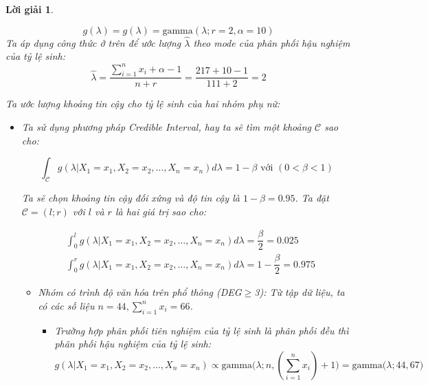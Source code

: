 \documentclass[14pt, a4paper]{article}
\theoremstyle{sltheorem}
\theoremstyle{soltheorem}
\newtheorem*{loigiai}{Lời giải}
\begin{document}
\begin{loigiai}
\begin{enumerate}
\begin{itemize}
\begin{itemize}
                \begin{equation*}
                    g(\lambda) = g(\lambda) = \text{gamma}(\lambda; r=2, \alpha=10)
                \end{equation*}
                Ta áp dụng công thức ở trên để ước lượng $\hat{\lambda}$ theo mode của phân phối hậu nghiệm của tỷ lệ sinh:
                \begin{equation*}
                    \hat{\lambda} = \dfrac{\sum_{i=1}^n x_i + \alpha - 1}{n + r} = \dfrac{217+10-1}{111 + 2}=2
                \end{equation*}
            \end{itemize}
        \end{itemize}

        Ta ước lượng khoảng tin cậy cho tỷ lệ sinh của hai nhóm phụ nữ:

        \begin{itemize}
            \item Ta sử dụng phương pháp Credible Interval, hay ta sẽ tìm một khoảng $\mathcal{C}$ sao cho:

        \begin{equation*}
            \int_{\mathcal{C}} g(\lambda \vert X_1 =x_1, X_2=x_2, \dots, X_n=x_n) d\lambda = 1 - \beta \text{ với } (0 < \beta < 1)
        \end{equation*}

        Ta sẽ chọn khoảng tin cậy đối xứng và độ tin cậy là $1-\beta=0.95$.
        Ta đặt $\mathcal{C}=(l;r)$ với $l$ và $r$ là hai giá trị sao cho:

        \begin{equation*}
            \begin{aligned}
                &\int_{0}^l g(\lambda \vert X_1 =x_1, X_2=x_2, \dots, X_n=x_n) d\lambda = \dfrac{\beta}{2}=0.025 \\
                &\int_{0}^r g(\lambda \vert X_1 =x_1, X_2=x_2, \dots, X_n=x_n) d\lambda = 1-\dfrac{\beta}{2}=0.975
            \end{aligned}
        \end{equation*}

        \begin{itemize}
            \item Nhóm có trình độ văn hóa trên phổ thông (DEG$\geq$3):
            Từ tập dữ liệu, ta có các số liệu $n=44, \sum_{i=1}^n x_i=66$.
            \begin{itemize}
                \item Trường hợp phân phối tiên nghiệm của tỷ lệ sinh là phân phối đều thì phân phối hậu nghiệm của tỷ lệ sinh:
                \begin{equation*}
                    g(\lambda \vert X_1 =x_1, X_2=x_2, \dots, X_n=x_n) \propto \text{gamma}\big(\lambda; n, (\sum_{i=1}^n x_i) + 1\big) = \text{gamma}\big(\lambda; 44, 67\big)
                \end{equation*}


\end{itemize}
\end{itemize}
\end{itemize}
\end{enumerate}
\end{loigiai}
\end{document}
